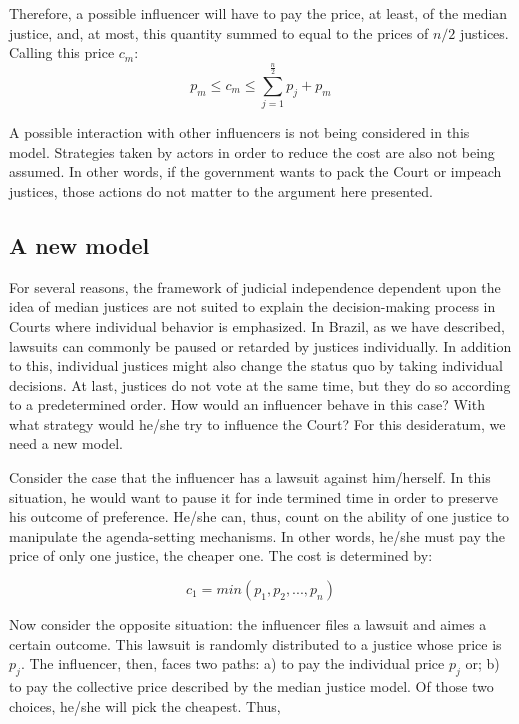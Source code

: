 \documentclass[12pt, a4paper]{article}
\begin{document}
Therefore, a possible influencer will have to pay the price, at least,
of the median justice, and, at most, this quantity summed to
equal to the prices of $n/2$ justices. Calling this price $c_m$: 
\begin{equation} 
	p_m \leq c_m  \leq \sum\limits_{j=1}^{\frac{n}{2}}p_j + p_m
\end{equation}
	
A possible
interaction with other influencers is not being considered in this model.
Strategies taken by actors in order to reduce the cost are also not being
assumed. In other words, if the government wants to pack the Court or
impeach justices, those actions do not matter to the argument here presented.






\subsection{A new model}


For several reasons, the framework of judicial independence 
dependent upon the idea of median justices are not suited to 
explain the decision-making process in Courts where individual 
behavior is emphasized. In Brazil, as we have described, 
lawsuits can commonly be paused or retarded by justices individually. 
In addition to this, individual justices might also change the status quo 
by taking individual decisions. At last, justices do not vote at 
the same time, but they do so according to a predetermined order. 
How would an influencer behave in this case? With what strategy 
would he/she try to influence the Court? For this desideratum, 
we need a new model. 

Consider the case that the influencer has a lawsuit against him/herself.
In this situation, he would want to pause it for inde termined time in 
order to preserve his outcome of preference. He/she can, thus, count on the
ability of one justice to manipulate the agenda-setting mechanisms.
In other words, he/she must pay the price of only one justice, the cheaper one.
The cost is determined by: 

\begin{equation} 
	c_1 = min(p_1, p_2, ..., p_n)
\end{equation}

Now consider the opposite situation: the influencer files a lawsuit
and aimes a certain outcome. This lawsuit is randomly distributed
to a justice whose price is $p_j$. The influencer, then, faces two
paths: a) to pay the individual price $p_j$ or; b) to pay the collective price 
described by the median justice model.  Of those two choices, he/she will pick
the cheapest. Thus, 
\end{document}
